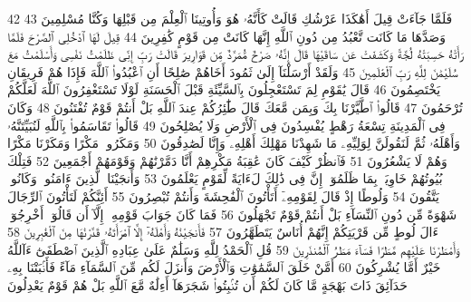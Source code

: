 {\tiny\colorbox{cl_aya}{42}} فَلَمَّا جَآءَتْ قِيلَ أَهَٰكَذَا عَرْشُكِ قَالَتْ كَأَنَّهُۥ هُوَ وَأُوتِينَا ٱلْعِلْمَ مِن قَبْلِهَا وَكُنَّا مُسْلِمِينَ
{\tiny\colorbox{cl_aya}{43}} وَصَدَّهَا مَا كَانَت تَّعْبُدُ مِن دُونِ ٱللَّهِ إِنَّهَا كَانَتْ مِن قَوْمٍ كَٰفِرِينَ
{\tiny\colorbox{cl_aya}{44}} قِيلَ لَهَا ٱدْخُلِى ٱلصَّرْحَ فَلَمَّا رَأَتْهُ حَسِبَتْهُ لُجَّةً وَكَشَفَتْ عَن سَاقَيْهَا قَالَ إِنَّهُۥ صَرْحٌ مُّمَرَّدٌ مِّن قَوَارِيرَ قَالَتْ رَبِّ إِنِّى ظَلَمْتُ نَفْسِى وَأَسْلَمْتُ مَعَ سُلَيْمَٰنَ لِلَّهِ رَبِّ ٱلْعَٰلَمِينَ
{\tiny\colorbox{cl_aya}{45}} وَلَقَدْ أَرْسَلْنَآ إِلَىٰ ثَمُودَ أَخَاهُمْ صَٰلِحًا أَنِ ٱعْبُدُوا۟ ٱللَّهَ فَإِذَا هُمْ فَرِيقَانِ يَخْتَصِمُونَ
{\tiny\colorbox{cl_aya}{46}} قَالَ يَٰقَوْمِ لِمَ تَسْتَعْجِلُونَ بِٱلسَّيِّئَةِ قَبْلَ ٱلْحَسَنَةِ لَوْلَا تَسْتَغْفِرُونَ ٱللَّهَ لَعَلَّكُمْ تُرْحَمُونَ
{\tiny\colorbox{cl_aya}{47}} قَالُوا۟ ٱطَّيَّرْنَا بِكَ وَبِمَن مَّعَكَ قَالَ طَٰٓئِرُكُمْ عِندَ ٱللَّهِ بَلْ أَنتُمْ قَوْمٌ تُفْتَنُونَ
{\tiny\colorbox{cl_aya}{48}} وَكَانَ فِى ٱلْمَدِينَةِ تِسْعَةُ رَهْطٍ يُفْسِدُونَ فِى ٱلْأَرْضِ وَلَا يُصْلِحُونَ
{\tiny\colorbox{cl_aya}{49}} قَالُوا۟ تَقَاسَمُوا۟ بِٱللَّهِ لَنُبَيِّتَنَّهُۥ وَأَهْلَهُۥ ثُمَّ لَنَقُولَنَّ لِوَلِيِّهِۦ مَا شَهِدْنَا مَهْلِكَ أَهْلِهِۦ وَإِنَّا لَصَٰدِقُونَ
{\tiny\colorbox{cl_aya}{50}} وَمَكَرُوا۟ مَكْرًا وَمَكَرْنَا مَكْرًا وَهُمْ لَا يَشْعُرُونَ
{\tiny\colorbox{cl_aya}{51}} فَٱنظُرْ كَيْفَ كَانَ عَٰقِبَةُ مَكْرِهِمْ أَنَّا دَمَّرْنَٰهُمْ وَقَوْمَهُمْ أَجْمَعِينَ
{\tiny\colorbox{cl_aya}{52}} فَتِلْكَ بُيُوتُهُمْ خَاوِيَةًۢ بِمَا ظَلَمُوٓا۟ إِنَّ فِى ذَٰلِكَ لَءَايَةً لِّقَوْمٍ يَعْلَمُونَ
{\tiny\colorbox{cl_aya}{53}} وَأَنجَيْنَا ٱلَّذِينَ ءَامَنُوا۟ وَكَانُوا۟ يَتَّقُونَ
{\tiny\colorbox{cl_aya}{54}} وَلُوطًا إِذْ قَالَ لِقَوْمِهِۦٓ أَتَأْتُونَ ٱلْفَٰحِشَةَ وَأَنتُمْ تُبْصِرُونَ
{\tiny\colorbox{cl_aya}{55}} أَئِنَّكُمْ لَتَأْتُونَ ٱلرِّجَالَ شَهْوَةً مِّن دُونِ ٱلنِّسَآءِ بَلْ أَنتُمْ قَوْمٌ تَجْهَلُونَ
{\tiny\colorbox{cl_aya}{56}} فَمَا كَانَ جَوَابَ قَوْمِهِۦٓ إِلَّآ أَن قَالُوٓا۟ أَخْرِجُوٓا۟ ءَالَ لُوطٍ مِّن قَرْيَتِكُمْ إِنَّهُمْ أُنَاسٌ يَتَطَهَّرُونَ
{\tiny\colorbox{cl_aya}{57}} فَأَنجَيْنَٰهُ وَأَهْلَهُۥٓ إِلَّا ٱمْرَأَتَهُۥ قَدَّرْنَٰهَا مِنَ ٱلْغَٰبِرِينَ
{\tiny\colorbox{cl_aya}{58}} وَأَمْطَرْنَا عَلَيْهِم مَّطَرًا فَسَآءَ مَطَرُ ٱلْمُنذَرِينَ
{\tiny\colorbox{cl_aya}{59}} قُلِ ٱلْحَمْدُ لِلَّهِ وَسَلَٰمٌ عَلَىٰ عِبَادِهِ ٱلَّذِينَ ٱصْطَفَىٰٓ ءَآللَّهُ خَيْرٌ أَمَّا يُشْرِكُونَ
{\tiny\colorbox{cl_aya}{60}} أَمَّنْ خَلَقَ ٱلسَّمَٰوَٰتِ وَٱلْأَرْضَ وَأَنزَلَ لَكُم مِّنَ ٱلسَّمَآءِ مَآءً فَأَنۢبَتْنَا بِهِۦ حَدَآئِقَ ذَاتَ بَهْجَةٍ مَّا كَانَ لَكُمْ أَن تُنۢبِتُوا۟ شَجَرَهَآ أَءِلَٰهٌ مَّعَ ٱللَّهِ بَلْ هُمْ قَوْمٌ يَعْدِلُونَ
